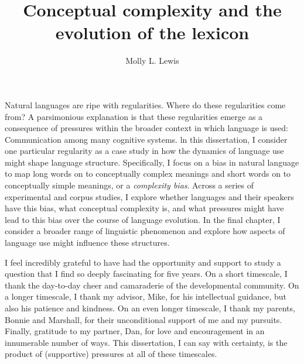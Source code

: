 \documentclass[12pt]{report}
\begin{document}
\title{Conceptual complexity and the evolution of the lexicon}
\author{Molly L. Lewis}
 
\beforepreface 
{}
Natural languages are ripe with regularities. Where do these regularities come from? A parsimonious explanation is that these regularities emerge as a consequence of pressures within the broader context in which language is used: Communication among many cognitive systems. ln this dissertation, I consider one particular regularity as a case study in how the dynamics of language use might shape language structure. Specifically, I focus on a bias in natural language to map long words on to conceptually complex meanings and short words on to conceptually simple meanings, or a {\it complexity bias}. Across a series of experimental and corpus studies, I explore whether languages and their speakers have this bias, what conceptual complexity is, and what pressures might have lead to this bias over the course of language evolution. In the final chapter, I consider a broader range of linguistic phenomenon and explore how aspects of language use might influence these structures. 

I feel incredibly grateful to have had the opportunity and support to study a question that I find so deeply fascinating for five years. On a short timescale, I thank the day-to-day cheer and camaraderie of the developmental community. On a longer timescale, I thank my advisor, Mike, for his intellectual guidance, but also his patience and kindness. On an even longer timescale, I thank my parents, Bonnie and Marshall, for their unconditional support of me and my pursuits. Finally, gratitude to my partner, Dan, for love and encouragement in an innumerable number of ways. This dissertation, I can say with certainty, is the product of (supportive) pressures at all of these timescales.  



\afterpreface












\end{document}
